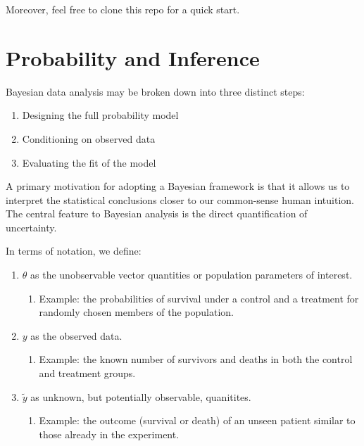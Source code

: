 \documentclass[]{book}
\providecommand{\tightlist}{%
  \setlength{\itemsep}{0pt}\setlength{\parskip}{0pt}}
\begin{document}
Moreover, feel free to clone this repo for a quick start.

\chapter{Probability and Inference}\label{intro}

Bayesian data analysis may be broken down into three distinct steps:

\begin{enumerate}
\def\labelenumi{\arabic{enumi}.}
\tightlist
\item
  Designing the full probability model
\item
  Conditioning on observed data
\item
  Evaluating the fit of the model
\end{enumerate}

A primary motivation for adopting a Bayesian framework is that it allows
us to interpret the statistical conclusions closer to our common-sense
human intuition. The central feature to Bayesian analysis is the direct
quantification of uncertainty.

In terms of notation, we define:

\begin{enumerate}
\def\labelenumi{\arabic{enumi}.}
\tightlist
\item
  \(\theta\) as the unobservable vector quantities or population
  parameters of interest.

  \begin{enumerate}
  \def\labelenumii{\alph{enumii}.}
  \tightlist
  \item
    Example: the probabilities of survival under a control and a
    treatment for randomly chosen members of the population.
  \end{enumerate}
\item
  \(y\) as the observed data.

  \begin{enumerate}
  \def\labelenumii{\alph{enumii}.}
  \setcounter{enumii}{1}
  \tightlist
  \item
    Example: the known number of survivors and deaths in both the
    control and treatment groups.
  \end{enumerate}
\item
  \(\tilde{y}\) as unknown, but potentially observable, quanitites.

  \begin{enumerate}
  \def\labelenumii{\alph{enumii}.}
  \setcounter{enumii}{2}
  \tightlist
  \item
    Example: the outcome (survival or death) of an unseen patient
    similar to those already in the experiment.
  \end{enumerate}
\end{enumerate}
\end{document}

